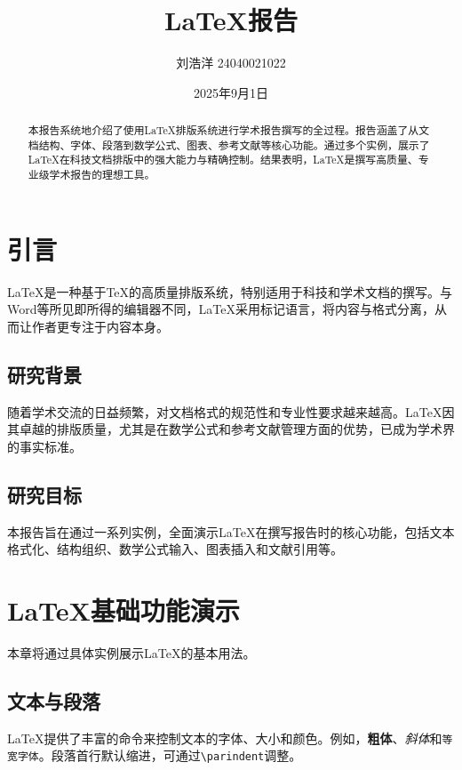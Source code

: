 \documentclass[12pt,a4paper]{report} %
\title{LaTeX报告}
\author{刘浩洋 24040021022}
\date{2025年9月1日}
\begin{document}
\frontmatter %
\maketitle

\begin{abstract}
本报告系统地介绍了使用LaTeX排版系统进行学术报告撰写的全过程。报告涵盖了从文档结构、字体、段落到数学公式、图表、参考文献等核心功能。通过多个实例，展示了LaTeX在科技文档排版中的强大能力与精确控制。结果表明，LaTeX是撰写高质量、专业级学术报告的理想工具。
\end{abstract}

\tableofcontents %

\mainmatter %
\chapter{引言}
LaTeX是一种基于TeX的高质量排版系统，特别适用于科技和学术文档的撰写。与Word等所见即所得的编辑器不同，LaTeX采用标记语言，将内容与格式分离，从而让作者更专注于内容本身。

\section{研究背景}
随着学术交流的日益频繁，对文档格式的规范性和专业性要求越来越高。LaTeX因其卓越的排版质量，尤其是在数学公式和参考文献管理方面的优势，已成为学术界的事实标准。

\section{研究目标}
本报告旨在通过一系列实例，全面演示LaTeX在撰写报告时的核心功能，包括文本格式化、结构组织、数学公式输入、图表插入和文献引用等。

\chapter{LaTeX基础功能演示}
本章将通过具体实例展示LaTeX的基本用法。

\section{文本与段落}
LaTeX提供了丰富的命令来控制文本的字体、大小和颜色。例如，\textbf{粗体}、\textit{斜体}和\texttt{等宽字体}。段落首行默认缩进，可通过\texttt{\textbackslash parindent}调整。
\end{document}
